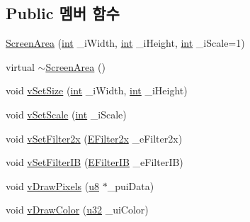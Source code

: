 \subsection*{Public 멤버 함수}
\begin{DoxyCompactItemize}
\item 
\mbox{\hyperlink{class_v_b_a_1_1_screen_area_a5bc7bd5f6077d82a7affa8527d3112c9}{Screen\+Area}} (\mbox{\hyperlink{_util_8cpp_a0ef32aa8672df19503a49fab2d0c8071}{int}} \+\_\+i\+Width, \mbox{\hyperlink{_util_8cpp_a0ef32aa8672df19503a49fab2d0c8071}{int}} \+\_\+i\+Height, \mbox{\hyperlink{_util_8cpp_a0ef32aa8672df19503a49fab2d0c8071}{int}} \+\_\+i\+Scale=1)
\item 
virtual \mbox{\hyperlink{class_v_b_a_1_1_screen_area_a3256c9d53615bdf68d84b11e29f725cd}{$\sim$\+Screen\+Area}} ()
\item 
void \mbox{\hyperlink{class_v_b_a_1_1_screen_area_a67e85578c2affd30bfe40b8768900d83}{v\+Set\+Size}} (\mbox{\hyperlink{_util_8cpp_a0ef32aa8672df19503a49fab2d0c8071}{int}} \+\_\+i\+Width, \mbox{\hyperlink{_util_8cpp_a0ef32aa8672df19503a49fab2d0c8071}{int}} \+\_\+i\+Height)
\item 
void \mbox{\hyperlink{class_v_b_a_1_1_screen_area_a39182c21dfcc5c1f58171986f9c6305f}{v\+Set\+Scale}} (\mbox{\hyperlink{_util_8cpp_a0ef32aa8672df19503a49fab2d0c8071}{int}} \+\_\+i\+Scale)
\item 
void \mbox{\hyperlink{class_v_b_a_1_1_screen_area_ad42090409e7ddec2c1cd9d715a38f8d9}{v\+Set\+Filter2x}} (\mbox{\hyperlink{class_v_b_a_a1683020d7324daf3bda627d0d3658e3e}{E\+Filter2x}} \+\_\+e\+Filter2x)
\item 
void \mbox{\hyperlink{class_v_b_a_1_1_screen_area_a7a23a673843050e232e83588cfab81ce}{v\+Set\+Filter\+IB}} (\mbox{\hyperlink{class_v_b_a_a304ffeb9f4a8b26e7fa4e2eb620d780f}{E\+Filter\+IB}} \+\_\+e\+Filter\+IB)
\item 
void \mbox{\hyperlink{class_v_b_a_1_1_screen_area_ad7b6579afb665abf3b6a5004f03b63f8}{v\+Draw\+Pixels}} (\mbox{\hyperlink{_system_8h_aed742c436da53c1080638ce6ef7d13de}{u8}} $\ast$\+\_\+pui\+Data)
\item 
void \mbox{\hyperlink{class_v_b_a_1_1_screen_area_aaefba8f2cfd6d3c759df0b38f9edd1bd}{v\+Draw\+Color}} (\mbox{\hyperlink{_system_8h_a10e94b422ef0c20dcdec20d31a1f5049}{u32}} \+\_\+ui\+Color)
\end{DoxyCompactItemize}

